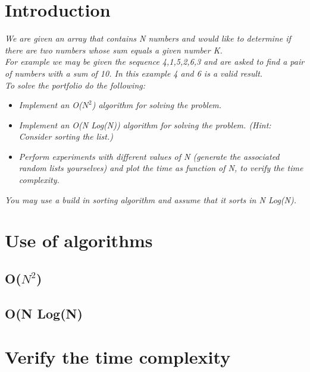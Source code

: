 \section{Introduction}
\emph{We are given an array that contains N numbers and would like to determine if there are two numbers whose sum equals a given number K.\\
For example we may be given the sequence 4,1,5,2,6,3 and are asked to find a pair of numbers with a sum of 10. In this example 4 and 6 is a valid result.\\
To solve the portfolio do the following:}
\begin{itemize}
\item \emph{Implement an O(\(N^{2}\)) algorithm for solving the problem.}
\item \emph{Implement an O(N Log(N)) algorithm for solving the problem. (Hint: Consider sorting the list.)}
\item \emph{Perform experiments with different values of N (generate the associated random lists yourselves)
and plot the time as function of N, to verify the time complexity.}
\end{itemize}
\emph{You may use a build in sorting algorithm and assume that it sorts in N Log(N).}

\section{Use of algorithms}
\subsection{O(\(N^{2}\))}
\subsection{O(N Log(N)}

\section{Verify the time complexity}


